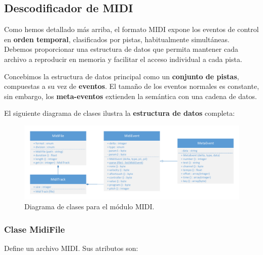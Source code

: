 \smallskip

\subsection{Descodificador de MIDI}
\label{subsec:daemon_midi}

Como hemos detallado más arriba, el formato \acrshort{MIDI} expone los eventos de control en \textbf{orden temporal}, clasificados por pistas, habitualmente simultáneas. Debemos proporcionar una estructura de datos que permita mantener cada archivo a reproducir en memoria y facilitar el acceso individual a cada pista.

Concebimos la estructura de datos principal como un \textbf{conjunto de pistas}, compuestas a su vez de \textbf{eventos}. El tamaño de los eventos normales es constante, sin embargo, los \textbf{meta-eventos} extienden la semántica con una cadena de datos.

El siguiente diagrama de clases ilustra la \textbf{estructura de datos} completa:

\smallskip

\begin{figure}[H]
	\noindent \begin{centering}
		\includegraphics[width=\linewidth]{capitulo4/uml_midi}
		\par\end{centering}
	\smallskip
	\caption{\label{fig:uml_midi} Diagrama de clases para el módulo MIDI.}
\end{figure} 

\smallskip

\subsubsection{Clase MidiFile}

Define un archivo \acrshort{MIDI}. Sus atributos son:

